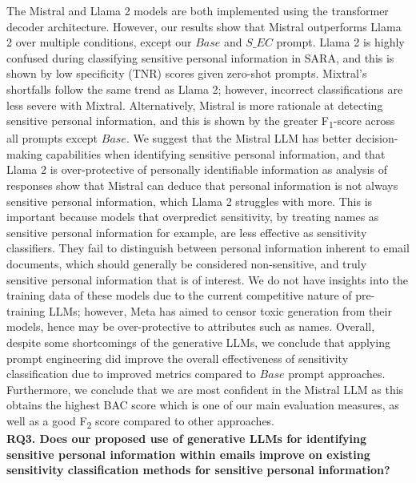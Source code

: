 The Mistral and Llama 2 models are both implemented using the transformer decoder architecture. However, our results show that Mistral outperforms Llama 2 over multiple conditions, except our $Base$ and $S\_EC$ prompt. Llama 2 is highly confused during classifying sensitive personal information in SARA, and this is shown by low specificity (TNR) scores given zero-shot prompts. Mixtral's shortfalls follow the same trend as Llama 2; however, incorrect classifications are less severe with Mixtral. Alternatively, Mistral is more rationale at detecting sensitive personal information, and this is shown by the greater F\textsubscript{1}-score across all prompts except $Base$. We suggest that the Mistral LLM has better decision-making capabilities when identifying sensitive personal information, and that Llama 2 is over-protective of personally identifiable information as analysis of responses show that Mistral can deduce that personal information is not always sensitive personal information, which Llama 2 struggles with more. This is important because models that overpredict sensitivity, by treating names as sensitive personal information for example, are less effective as sensitivity classifiers. They fail to distinguish between personal information inherent to email documents, which should generally be considered non-sensitive, and truly sensitive personal information that is of interest. We do not have insights into the training data of these models due to the current competitive nature of pre-training LLMs; however, Meta has aimed to censor toxic generation from their models, hence may be over-protective to attributes such as names. Overall, despite some shortcomings of the generative LLMs, we conclude that applying prompt engineering did improve the overall effectiveness of sensitivity classification due to improved metrics compared to $Base$ prompt approaches. Furthermore, we conclude that we are most confident in the Mistral LLM as this obtains the highest BAC score which is one of our main evaluation measures, as well as a good F\textsubscript{2} score compared to other approaches. \\

\textbf{RQ3. Does our proposed use of generative LLMs for identifying sensitive personal information within emails improve on existing sensitivity classification methods for sensitive personal information?}

